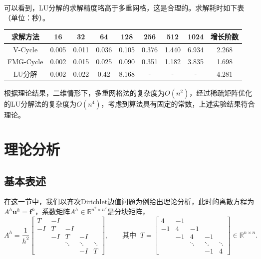 \documentclass[lang=cn,10pt]{elegantbook}
\begin{document}
可以看到，LU分解的求解精度略高于多重网格，这是合理的。求解耗时如下表（单位：秒）。

\begin{table}[H]
  \centering
  \small
  \begin{tabular}{c|ccccccc|c}
求解方法        & 16                   & 32                   & 64                   & 128                  & 256                  & 512                  & 1024                & 增长阶数 \\ \hline
V-Cycle        & 0.005 & 0.011 & 0.036 & 0.105 & 0.376 & 1.440 &  6.934 & 2.268  \\
FMG-Cycle      & 0.002 & 0.015 & 0.025 & 0.090 & 0.351 & 1.182 &  3.835 & 1.698 \\
LU分解         & 0.002 & 0.022 & 0.42 & 8.168 & - & - & - & 4.281
\end{tabular}
\end{table}

根据理论结果，二维情形下，多重网格法的复杂度为$O(n^2)$，经过稀疏矩阵优化的LU分解法的复杂度为$O(n^4)$，考虑到算法具有固定的常数，上述实验结果符合理论。

\section{理论分析}

\subsection{基本表述}

在这一节中，我们以齐次Dirichlet边值问题为例给出理论分析，此时的离散方程为$A^h\mathbf{u}^h=\mathbf{f}^h$，系数矩阵$A^h\in\mathbb{R}^{n^2\times n^2}$是分块矩阵，
\begin{equation}
  A^h=\frac{1}{h^2}\begin{bmatrix}
    T & -I & \\
    -I & T & -I & \\
    & -I & T & -I &\\
    & & \ddots & \ddots & \ddots\\
    & & & -I & T
  \end{bmatrix},\qquad \text{其中}\;\;
  T=\begin{bmatrix}
    4 & -1 & \\
    -1 & 4 & -1 & \\
    & -1 & 4 & -1 &\\
    & & \ddots & \ddots & \ddots\\
    & & & -1 & 4
  \end{bmatrix}\in\mathbb{R}^{n\times n}.
\end{equation}
\end{document}

